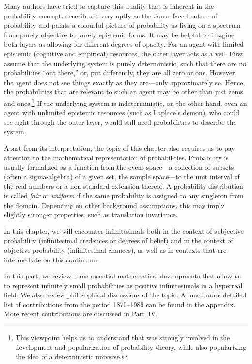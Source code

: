 Many authors have tried to capture this duality that is inherent in the probability concept. \citet{Hacking:1975} describes it very aptly as the Janus-faced nature of probability and \citet{Gaifman:1986} paints a colourful picture of probability as living on a spectrum from purely objective to purely epistemic forms.
It may be helpful to imagine both layers as allowing for different degrees of opacity.
For an agent with limited epistemic (cognitive and empirical) resources, the outer layer acts as a veil.
First assume that the underlying system is purely deterministic, such that there are no probabilities ``out there,'' or, put differently, they are all zero or one. However, the agent does not see things exactly as they are---only approximately so. Hence, the probabilities that are relevant to such an agent may be other than just zeros and ones.\footnote{This viewpoint helps us to understand that \citet{Laplace:1814} was strongly involved in the development and popularization of probability theory, while also popularizing the idea of a deterministic universe.} If the underlying system is indeterministic, on the other hand, even an agent with unlimited epistemic resources (such as Laplace's demon), who could see right through the outer layer, would still need probabilities to describe the system.

%

Apart from its interpretation, the topic of this chapter also requires us to pay attention to the mathematical representation of probabilities. Probability is usually formalized as a function from the event space---a collection of subsets (often a sigma-algebra) of a given set, the sample space---to the unit interval of the real numbers or a non-standard extension thereof. A probability distribution is called \textit{fair} or \textit{uniform} if the same probability is assigned to any singleton from the domain. Depending on other background assumptions, this may imply slightly stronger properties, such as translation invariance.

In this chapter, we will encounter infinitesimals both in the context of subjective probability (infinitesimal credences or degrees of belief) and in the context of objective probability (infinitesimal chances), as well as in contexts that are intermediate on this continuum.

\label{part:hist}

\noindent In this part, we review some essential mathematical developments that allow us to represent infinitely small probabilities as positive infinitesimals in a hyperreal field. We also review philosophical discussions of the topic. A much more detailed list of contributions from the period 1870--1989 can be found in the appendix. More recent contributions are discussed in Part~IV.

